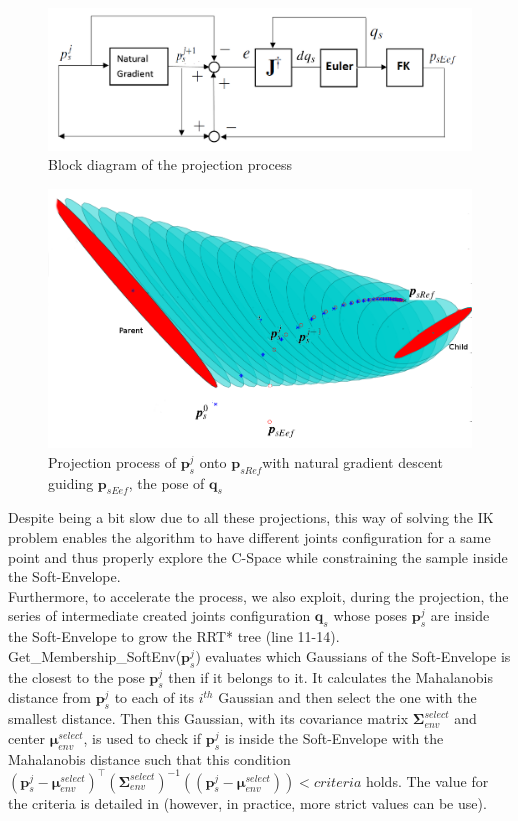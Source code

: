 \documentclass[letterpaper, 10 pt, conference]{ieeeconf}  %
\newcommand{\trsp}{{\!\scriptscriptstyle\top}}
\newcommand{\mb}[1]{{\boldsymbol{#1}}}
\begin{document}
\begin{figure}[h]
	\centering
	\includegraphics[scale=0.35]{figure/loopControl.png}
	\caption{Block diagram of the projection process}
	\label{loopControl}
\end{figure}
 \begin{figure}[h]
 	\centering
 	\includegraphics[scale=0.25]{figure/natProjFinal2.png}
 	\caption{Projection process of $\mb{p}_s^j$ onto $\mb{p}_{sRef}$with natural gradient descent guiding  $\mb{p}_{sEef}$, the pose of $\mb{q}_s$}
 	\label{ProjNat}
 \end{figure}
Despite being a bit slow due to all these projections, this way of solving the IK problem enables the algorithm to have different joints configuration for a same point and thus properly explore the C-Space while constraining the sample inside the Soft-Envelope.\\
Furthermore, to accelerate the process, we also exploit, during the projection, the series of intermediate created joints configuration $\mb{q}_s$ whose poses $\mb{p}_s^j$ are inside the Soft-Envelope to grow the RRT* tree (line 11-14).\\
{\selectfont Get\_Membership\_SoftEnv($\mb{p}_s^j$)} evaluates which Gaussians of the Soft-Envelope is the closest to the pose $\mb{p}_s^j$ then if it belongs to it. It calculates the Mahalanobis distance from $\mb{p}_s^j$  to each of its $i^{th}$ Gaussian and then select the one with the smallest distance. Then this Gaussian, with its covariance matrix  $\mb{\Sigma}_{env}^{select}$ and center $\mb{\mu}_{env}^{select}$, is used to check if $\mb{p}_s^j$ is inside the Soft-Envelope with the Mahalanobis distance such that this condition $(\mb{p}_s^j-\mb{\mu}_{env}^{select})^{\trsp}(\mb{\Sigma}_{env}^{select})^{-1} ((\mb{p}_s^j-\mb{\mu}_{env}^{select})) < criteria$ holds. The value for the criteria is detailed in \cite{Filzmoser04amultivariate} (however, in practice, more strict values can be use). \\
\end{document}
